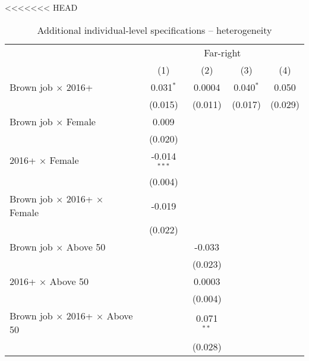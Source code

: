 <<<<<<< HEAD

\begin{table}[htbp]
   \caption{Additional individual-level specifications – heterogeneity}
   \centering
   \begin{tabular}{lcccc}
      \tabularnewline \midrule \midrule
       & \multicolumn{4}{c}{Far-right}\\
                                                      & (1)            & (2)          & (3)            & (4)\\  
      Brown job $\times$ 2016+                        & 0.031$^{*}$    & 0.0004       & 0.040$^{*}$    & 0.050\\   
                                                      & (0.015)        & (0.011)      & (0.017)        & (0.029)\\   
      Brown job $\times$ Female                       & 0.009          &              &                &   \\   
                                                      & (0.020)        &              &                &   \\   
      2016+ $\times$ Female                           & -0.014$^{***}$ &              &                &   \\   
                                                      & (0.004)        &              &                &   \\   
      Brown job $\times$ 2016+ $\times$ Female        & -0.019         &              &                &   \\   
                                                      & (0.022)        &              &                &   \\   
      Brown job $\times$ Above 50                     &                & -0.033       &                &   \\   
                                                      &                & (0.023)      &                &   \\   
      2016+ $\times$ Above 50                         &                & 0.0003       &                &   \\   
                                                      &                & (0.004)      &                &   \\   
      Brown job $\times$ 2016+ $\times$ Above 50      &                & 0.071$^{**}$ &                &   \\   
                                                      &                & (0.028)      &                &   \\   

\end{tabular}
\end{table}
